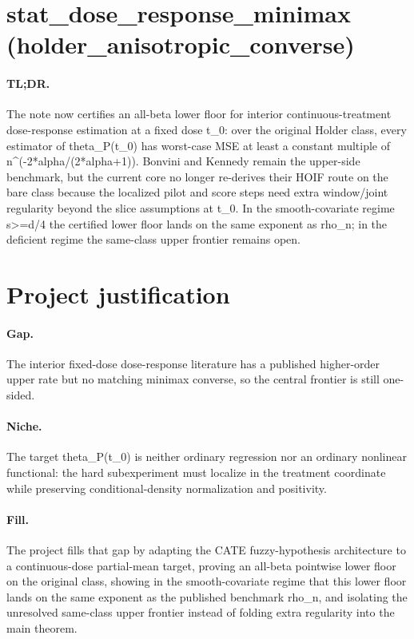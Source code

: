\documentclass{article}
\begin{document}
\section*{stat_dose_response_minimax (holder_anisotropic_converse)}

\paragraph{TL;DR.} The note now certifies an all-beta lower floor for interior continuous-treatment dose-response estimation at a fixed dose t_0: over the original Holder class, every estimator of theta_P(t_0) has worst-case MSE at least a constant multiple of n^(-2*alpha/(2*alpha+1)). Bonvini and Kennedy remain the upper-side benchmark, but the current core no longer re-derives their HOIF route on the bare class because the localized pilot and score steps need extra window/joint regularity beyond the slice assumptions at t_0. In the smooth-covariate regime s>=d/4 the certified lower floor lands on the same exponent as rho_n; in the deficient regime the same-class upper frontier remains open.

\section{Project justification}

\paragraph{Gap.} The interior fixed-dose dose-response literature has a published higher-order upper rate but no matching minimax converse, so the central frontier is still one-sided.

\paragraph{Niche.} The target theta_P(t_0) is neither ordinary regression nor an ordinary nonlinear functional: the hard subexperiment must localize in the treatment coordinate while preserving conditional-density normalization and positivity.

\paragraph{Fill.} The project fills that gap by adapting the CATE fuzzy-hypothesis architecture to a continuous-dose partial-mean target, proving an all-beta pointwise lower floor on the original class, showing in the smooth-covariate regime that this lower floor lands on the same exponent as the published benchmark rho_n, and isolating the unresolved same-class upper frontier instead of folding extra regularity into the main theorem.
\end{document}
